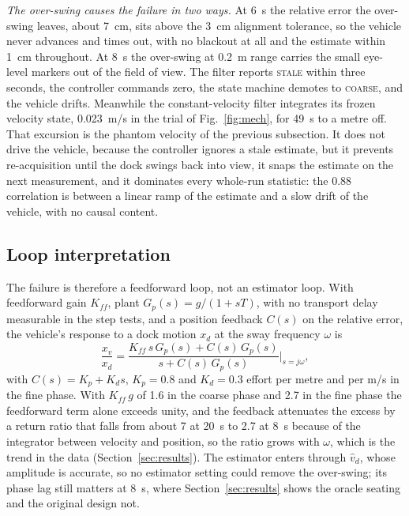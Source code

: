 \emph{The over-swing causes the failure in two ways.} At 6~s the relative error the over-swing leaves, about 7~cm, sits above the 3~cm alignment tolerance, so the vehicle never advances and times out, with no blackout at all and the estimate within 1~cm throughout. At 8~s the over-swing at 0.2~m range carries the small eye-level markers out of the field of view. The filter reports \textsc{stale} within three seconds, the controller commands zero, the state machine demotes to \textsc{coarse}, and the vehicle drifts. Meanwhile the constant-velocity filter integrates its frozen velocity state, 0.023~m/s in the trial of Fig.~\ref{fig:mech}, for 49~s to a metre off. That excursion is the phantom velocity of the previous subsection. It does not drive the vehicle, because the controller ignores a stale estimate, but it prevents re-acquisition until the dock swings back into view, it snaps the estimate on the next measurement, and it dominates every whole-run statistic: the 0.88 correlation is between a linear ramp of the estimate and a slow drift of the vehicle, with no causal content.

\subsection{Loop interpretation}

The failure is therefore a feedforward loop, not an estimator loop. With feedforward gain $K_{ff}$, plant $G_p(s) = g/(1 + sT)$, with no transport delay measurable in the step tests, and a position feedback $C(s)$ on the relative error, the vehicle's response to a dock motion $x_d$ at the sway frequency $\omega$ is
\begin{equation}
\frac{x_v}{x_d} = \frac{K_{ff}\,s\,G_p(s) + C(s)\,G_p(s)}{s + C(s)\,G_p(s)}\Big|_{s = j\omega},
\label{eq:loop}
\end{equation}
with $C(s) = K_p + K_d s$, $K_p = 0.8$ and $K_d = 0.3$ effort per metre and per m/s in the fine phase. With $K_{ff}\,g$ of 1.6 in the coarse phase and 2.7 in the fine phase the feedforward term alone exceeds unity, and the feedback attenuates the excess by a return ratio that falls from about 7 at 20~s to 2.7 at 8~s because of the integrator between velocity and position, so the ratio grows with $\omega$, which is the trend in the data (Section~\ref{sec:results}). The estimator enters through $\hat{v}_d$, whose amplitude is accurate, so no estimator setting could remove the over-swing; its phase lag still matters at 8~s, where Section~\ref{sec:results} shows the oracle seating and the original design not.
